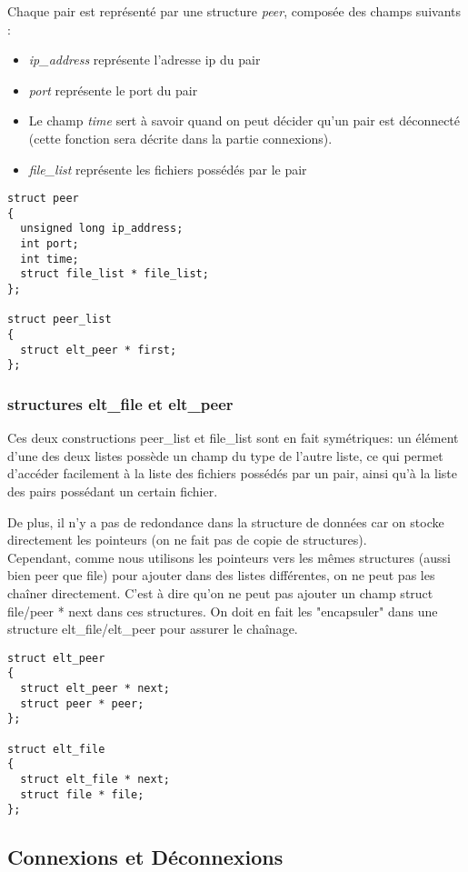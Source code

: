Chaque pair est représenté par une structure \textit{peer}, composée des champs suivants :
\begin{itemize}
\item \textit{ip\_address} représente l'adresse ip du pair
\item \textit{port} représente le port du pair
\item Le champ \textit{time} sert à savoir quand on peut décider qu'un pair est déconnecté (cette fonction sera décrite dans la partie connexions).
\item \textit{file\_list} représente les fichiers possédés par le pair
\end{itemize}
\begin{verbatim}
struct peer
{
  unsigned long ip_address;
  int port;
  int time;
  struct file_list * file_list;
};

struct peer_list
{
  struct elt_peer * first;
};
\end{verbatim}


\subsubsection{structures elt\_file et elt\_peer}

Ces deux constructions peer\_list et file\_list sont en fait symétriques: un élément d'une des deux listes possède un champ du type de l'autre liste, ce qui permet d'accéder facilement à la liste des fichiers possédés par un pair, ainsi qu'à la liste des pairs possédant un certain fichier.

De plus, il n'y a pas de redondance dans la structure de données car on stocke directement les pointeurs (on ne fait pas de copie de structures).\\ 
Cependant, comme nous utilisons les pointeurs vers les mêmes structures (aussi bien peer que file) pour ajouter dans des listes différentes, on ne peut pas les chaîner directement. C'est à dire qu'on ne peut pas ajouter un champ struct file/peer * next dans ces structures. On doit en fait les "encapsuler" dans une structure elt\_file/elt\_peer pour assurer le chaînage.
\begin{verbatim}
struct elt_peer
{
  struct elt_peer * next;
  struct peer * peer;
};

struct elt_file
{
  struct elt_file * next;
  struct file * file;
};
\end{verbatim}


\subsection{Connexions et Déconnexions}

